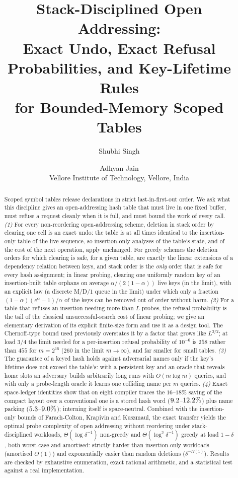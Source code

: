 \documentclass[11pt,a4paper]{article}
\title{Stack-Disciplined Open Addressing:\\Exact Undo, Exact Refusal Probabilities, and Key-Lifetime Rules\\for Bounded-Memory Scoped Tables}
\author{Shubhi Singh \and Adhyan Jain\\[2pt]\small Vellore Institute of Technology, Vellore, India}
\date{}
\theoremstyle{definition}
\theoremstyle{remark}
\begin{document}
\maketitle

\begin{abstract}
\noindent Scoped symbol tables release declarations in strict last-in-first-out order. We ask what this discipline gives an open-addressing hash table that must live in one fixed buffer, must refuse a request cleanly when it is full, and must bound the work of every call. \emph{(1)} For every non-reordering open-addressing scheme, deletion in stack order by clearing one cell is an exact undo: the table is at all times identical to the insertion-only table of the live sequence, so insertion-only analyses of the table's state, and of the cost of the next operation, apply unchanged. For greedy schemes the deletion orders for which clearing is safe, for a given table, are exactly the linear extensions of a dependency relation between keys, and stack order is the \emph{only} order that is safe for every hash assignment; in linear probing, clearing one uniformly random key of an insertion-built table orphans on average $\alpha/(2(1-\alpha))$ live keys (in the limit), with an explicit law (a discrete M/D/1 queue in the limit) under which only a fraction $(1-\alpha)(e^{\alpha}-1)/\alpha$ of the keys can be removed out of order without harm. \emph{(2)} For a table that refuses an insertion needing more than $L$ probes, the refusal probability is the tail of the classical unsuccessful-search cost of linear probing; we give an elementary derivation of its explicit finite-size form and use it as a design tool. The Chernoff-type bound used previously overstates it by a factor that grows like $L^{3/2}$; at load $3/4$ the limit needed for a per-insertion refusal probability of $10^{-6}$ is $258$ rather than $455$ for $m=2^{16}$ ($260$ in the limit $m\to\infty$), and far smaller for small tables. \emph{(3)} The guarantee of a keyed hash holds against adversarial names only if the key's lifetime does not exceed the table's: with a persistent key and an oracle that reveals home slots an adversary builds arbitrarily long runs with $O(m\log m)$ queries, and with only a probe-length oracle it learns one colliding name per $m$ queries. \emph{(4)} Exact space-ledger identities show that on eight compiler traces the $16$--$18\%$ saving of the compact layout over a conventional one is a stored hash word ($9.2$--$12.2\%$) plus name packing ($5.3$--$9.0\%$); interning itself is space-neutral. Combined with the insertion-only bounds of Farach-Colton, Krapivin and Kuszmaul, the exact transfer yields the optimal probe complexity of open addressing without reordering under stack-disciplined workloads, $\Theta(\log\delta^{-1})$ non-greedy and $\Theta(\log^2\delta^{-1})$ greedy at load $1-\delta$, both worst-case and amortised: strictly harder than insertion-only workloads (amortised $O(1)$) and exponentially easier than random deletions ($\delta^{-\Omega(1)}$). Results are checked by exhaustive enumeration, exact rational arithmetic, and a statistical test against a real implementation.
\end{abstract}
\end{document}
